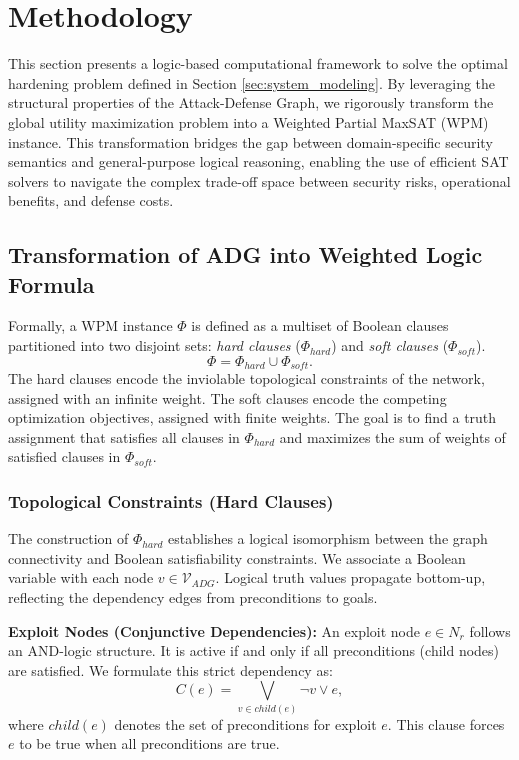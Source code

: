 \documentclass[conference]{IEEEtran}
\theoremstyle{definition} %
\theoremstyle{plain} %
\begin{document}
\section{Methodology}
\label{sec:methodology}

This section presents a logic-based computational framework to solve the optimal hardening problem defined in Section \ref{sec:system_modeling}. By leveraging the structural properties of the Attack-Defense Graph, we rigorously transform the global utility maximization problem into a Weighted Partial MaxSAT (WPM) instance. This transformation bridges the gap between domain-specific security semantics and general-purpose logical reasoning, enabling the use of efficient SAT solvers to navigate the complex trade-off space between security risks, operational benefits, and defense costs.

\subsection{Transformation of ADG into Weighted Logic Formula}
\label{subsec:transformation}

Formally, a WPM instance $\Phi$ is defined as a multiset of Boolean clauses partitioned into two disjoint sets: \textit{hard clauses} ($\Phi_{hard}$) and \textit{soft clauses} ($\Phi_{soft}$).
\begin{equation}
    \Phi = \Phi_{hard} \cup \Phi_{soft}.
\end{equation}
The hard clauses encode the inviolable topological constraints of the network, assigned with an infinite weight. The soft clauses encode the competing optimization objectives, assigned with finite weights. The goal is to find a truth assignment that satisfies all clauses in $\Phi_{hard}$ and maximizes the sum of weights of satisfied clauses in $\Phi_{soft}$.

\subsubsection{Topological Constraints (Hard Clauses)}
The construction of $\Phi_{hard}$ establishes a logical isomorphism between the graph connectivity and Boolean satisfiability constraints. We associate a Boolean variable with each node $v \in \mathcal{V}_{ADG}$. Logical truth values propagate bottom-up, reflecting the dependency edges from preconditions to goals.

\textbf{Exploit Nodes (Conjunctive Dependencies):}
An exploit node $e \in N_r$ follows an AND-logic structure. It is active if and only if all preconditions (child nodes) are satisfied. We formulate this strict dependency as:
\begin{equation}
    \label{eq:hard_exploit}
    C(e) = \bigvee_{v \in child(e)} \neg v \vee e,
\end{equation}
where $child(e)$ denotes the set of preconditions for exploit $e$. This clause forces $e$ to be true when all preconditions are true.
\end{document}
